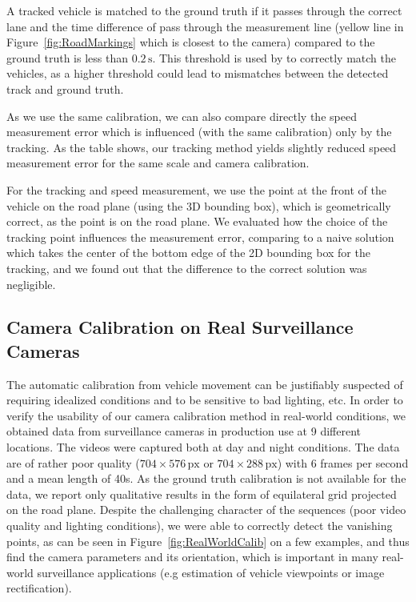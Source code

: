 \documentclass[]{elsarticle}
\begin{document}
A tracked vehicle is matched to the ground truth if it passes through the correct lane and the time difference of pass through the measurement line (yellow line in Figure~\ref{fig:RoadMarkings} which is closest to the camera) compared to the ground truth is less than $0.2\,\mathrm{s}$. This threshold is used by \cite{BrnoCompSpeed} to correctly match the vehicles, as a higher threshold could lead to mismatches between the detected track and ground truth.

As we use the same calibration, we can also compare directly the speed measurement error which is influenced (with the same calibration) only by the tracking. As the table shows, our tracking method yields slightly reduced speed measurement error for the same scale and camera calibration.



For the tracking and speed measurement, we use the point at the front of the vehicle on the road plane (using the 3D bounding box), which is geometrically correct, as the point is on the road plane. We evaluated how the choice of the tracking point influences the measurement error, comparing to a naive solution which takes the center of the bottom edge of the 2D bounding box for the tracking, and we found out that the difference to the correct solution was negligible.


\subsection{Camera Calibration on Real Surveillance Cameras}
\label{sec:RealCameras}

The automatic calibration from vehicle movement can be justifiably suspected of requiring idealized conditions and to be sensitive to bad lighting, etc.
In order to verify the usability of our camera calibration method in real-world conditions, we obtained data from surveillance cameras in production use at 9 different locations. The videos were captured both at day and night conditions. The data are of rather poor quality ($704 \times 576\,\mathrm{px}$ or $704 \times 288\,\mathrm{px}$) with 6 frames per second and a mean length of 40s.
As the ground truth calibration is not available for the data, we report only qualitative results in the form of equilateral grid projected on the road plane.
Despite the challenging character of the sequences (poor video quality and lighting conditions), we were able to correctly detect the vanishing points, as can be seen in Figure~\ref{fig:RealWorldCalib} on a few examples, and thus find the camera parameters and its orientation, which is important in many real-world surveillance applications (e.g estimation of vehicle viewpoints or image rectification).
\end{document}
